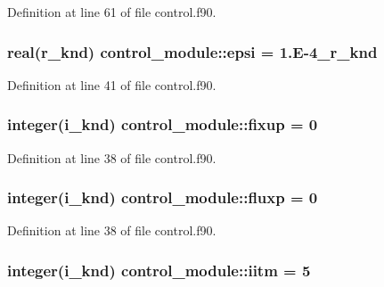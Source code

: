 Definition at line 61 of file control.\-f90.

\hypertarget{classcontrol__module_af1c813926ca0adb64361e5b48a4f73b9}{
\subsubsection[{epsi}]{\setlength{\rightskip}{0pt plus 5cm}real(r\-\_\-knd) control\-\_\-module\-::epsi = 1.\-E-\/4\-\_\-r\-\_\-knd}}\label{classcontrol__module_af1c813926ca0adb64361e5b48a4f73b9}


Definition at line 41 of file control.\-f90.

\hypertarget{classcontrol__module_ad305163b99235b021c5cf0f91e69c6d5}{
\subsubsection[{fixup}]{\setlength{\rightskip}{0pt plus 5cm}integer(i\-\_\-knd) control\-\_\-module\-::fixup = 0}}\label{classcontrol__module_ad305163b99235b021c5cf0f91e69c6d5}


Definition at line 38 of file control.\-f90.

\hypertarget{classcontrol__module_afb6375328be86057f0ac0af554c9abac}{
\subsubsection[{fluxp}]{\setlength{\rightskip}{0pt plus 5cm}integer(i\-\_\-knd) control\-\_\-module\-::fluxp = 0}}\label{classcontrol__module_afb6375328be86057f0ac0af554c9abac}


Definition at line 38 of file control.\-f90.

\hypertarget{classcontrol__module_a668776c82e56b5c08c95f01915287eb2}{
\subsubsection[{iitm}]{\setlength{\rightskip}{0pt plus 5cm}integer(i\-\_\-knd) control\-\_\-module\-::iitm = 5}}\label{classcontrol__module_a668776c82e56b5c08c95f01915287eb2}


